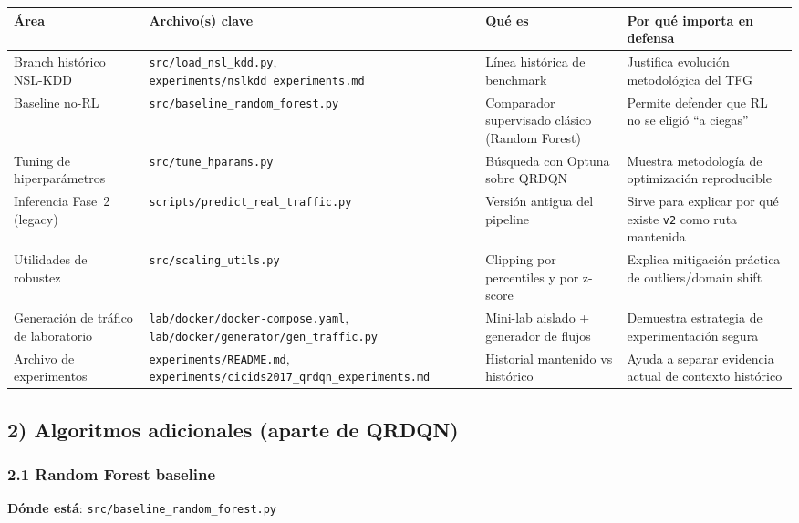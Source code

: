 ﻿\documentclass[12pt,a4paper]{article}
\begin{document}
\begin{table}[htbp]
\footnotesize
\begin{tabular}{p{3cm}p{3.5cm}p{3cm}p{3.5cm}}
\hline
\textbf{Área} & \textbf{Archivo(s) clave} & \textbf{Qué es} & \textbf{Por qué importa en defensa} \\
\hline
Branch histórico NSL-KDD
  & \verb|src/load_nsl_kdd.py|, \verb|experiments/nslkdd_experiments.md|
  & Línea histórica de benchmark
  & Justifica evolución metodológica del TFG \\
Baseline no-RL
  & \verb|src/baseline_random_forest.py|
  & Comparador supervisado clásico (Random Forest)
  & Permite defender que RL no se eligió ``a ciegas'' \\
Tuning de hiperparámetros
  & \verb|src/tune_hparams.py|
  & Búsqueda con Optuna sobre QRDQN
  & Muestra metodología de optimización reproducible \\
Inferencia Fase~2 (legacy)
  & \verb|scripts/predict_real_traffic.py|
  & Versión antigua del pipeline
  & Sirve para explicar por qué existe \texttt{v2} como ruta mantenida \\
Utilidades de robustez
  & \verb|src/scaling_utils.py|
  & Clipping por percentiles y por z-score
  & Explica mitigación práctica de outliers/domain shift \\
Generación de tráfico de laboratorio
  & \verb|lab/docker/docker-compose.yaml|, \verb|lab/docker/generator/gen_traffic.py|
  & Mini-lab aislado + generador de flujos
  & Demuestra estrategia de experimentación segura \\
Archivo de experimentos
  & \verb|experiments/README.md|, \verb|experiments/cicids2017_qrdqn_experiments.md|
  & Historial mantenido vs histórico
  & Ayuda a separar evidencia actual de contexto histórico \\
\hline
\end{tabular}
\end{table}

\subsection{2) Algoritmos adicionales (aparte de QRDQN)}

\subsubsection{2.1 Random Forest baseline}

\textbf{Dónde está}: \verb|src/baseline_random_forest.py|
\end{document}

